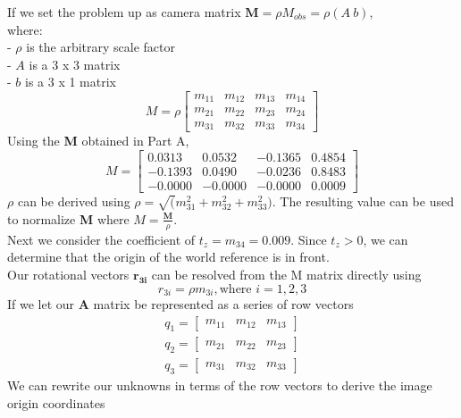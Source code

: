 \documentclass[12pt]{report}
\begin{document}
\begin{enumerate}
\begin{enumerate}
    If we set the problem up as camera matrix  \( \mathbf{M} = \rho M_{obs} = \rho (A \  b) \), \\
    where: \\
    - $\rho$ is the arbitrary scale factor \\
    - $A$ is a 3 x 3 matrix \\
    - $b$ is a 3 x 1 matrix \\
    $$
    M = \rho
    \begin{bmatrix}
    m_{11} & m_{12} & m_{13} & m_{14} \\
    m_{21} & m_{22} & m_{23} & m_{24} \\
    m_{31} & m_{32} & m_{33} & m_{34}
    \end{bmatrix}
    $$
    Using the \textbf{M} obtained in Part A,
    $$
    M = \begin{bmatrix}
    0.0313 & 0.0532 & -0.1365 & 0.4854 \\
    -0.1393 & 0.0490 & -0.0236 & 0.8483 \\
    -0.0000 & -0.0000 & -0.0000 & 0.0009
    \end{bmatrix}
    $$
    $\rho$ can be derived using $\rho = \sqrt(m_{31}^2 + m_{32}^2 + m_{33}^2)$. The resulting value can be used to normalize \textbf{M} where $M = \frac{\mathbf{M}}{\rho}$. \\
    Next we consider the coefficient of $t_z = m_{34} = 0.009$. Since $t_z > 0$, we can determine that the origin of the world reference is in front. \\
    Our rotational vectors $\mathbf{r_{3i}}$ can be resolved from the M matrix directly using 
    $$r_{3i} = \rho m_{3i}, \text{where } i=1,2,3$$
    If we let our \textbf{A} matrix be represented as a series of row vectors
    \begin{equation}
    \begin{split}
    q_1 = \begin{bmatrix}m_{11} & m_{12} & m_{13}\end{bmatrix} \\
    q_2 = \begin{bmatrix}m_{21} & m_{22} & m_{23}\end{bmatrix} \\
    q_3 = \begin{bmatrix}m_{31} & m_{32} & m_{33}\end{bmatrix}
    \end{split}
    \end{equation}
    We can rewrite our unknowns in terms of the row vectors to derive the image origin coordinates 

\end{enumerate}
\end{enumerate}
\end{document}
